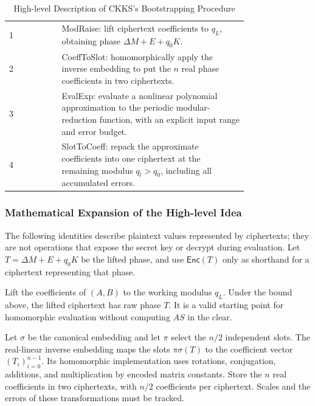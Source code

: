 \begin{table}
\begin{tabular}{|lp{0.78\linewidth}|}
\hline
1 & \textsf{ModRaise}: lift ciphertext coefficients to $q_L$, obtaining phase $\Delta M+E+q_0K$.\\
2 & \textsf{CoeffToSlot}: homomorphically apply the inverse embedding to put the $n$ real phase coefficients in two ciphertexts.\\
3 & \textsf{EvalExp}: evaluate a nonlinear polynomial approximation to the periodic modular-reduction function, with an explicit input range and error budget.\\
4 & \textsf{SlotToCoeff}: repack the approximate coefficients into one ciphertext at the remaining modulus $q_l>q_0$, including all accumulated errors.\\
\hline
\end{tabular}
\caption{High-level Description of CKKS's Bootstrapping Procedure}
\label{tab:ckks-bootstrapping-procedure}
\end{table}

\subsubsection{Mathematical Expansion of the High-level Idea}
\label{subsubsec:ckks-bootstrapping-high-level-correctness}

The following identities describe plaintext values represented by ciphertexts; they are not operations that expose the secret key or decrypt during evaluation. Let $T=\Delta M+E+q_0K$ be the lifted phase, and use $\mathsf{Enc}(T)$ only as shorthand for a ciphertext representing that phase.

 Lift the coefficients of $(A,B)$ to the working modulus $q_L$. Under the bound above, the lifted ciphertext has raw phase $T$. It is a valid starting point for homomorphic evaluation without computing $AS$ in the clear.

 Let $\sigma$ be the canonical embedding and let $\pi$ select the $n/2$ independent slots. The real-linear inverse embedding maps the slots $\pi\sigma(T)$ to the coefficient vector $(T_i)_{i=0}^{n-1}$. Its homomorphic implementation uses rotations, conjugation, additions, and multiplication by encoded matrix constants. Store the $n$ real coefficients in two ciphertexts, with $n/2$ coefficients per ciphertext. Scales and the errors of these transformations must be tracked.

